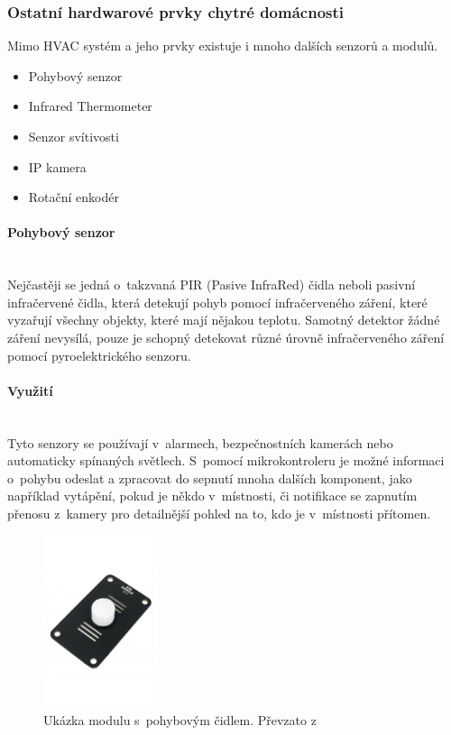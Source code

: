 \subsubsection*{Ostatní hardwarové prvky chytré domácnosti}
Mimo HVAC systém a jeho prvky existuje i mnoho dalších senzorů a modulů.

\begin{itemize}
  \item Pohybový senzor
  \item Infrared Thermometer
  \item Senzor svítivosti
  \item IP kamera
  \item Rotační enkodér
  \end{itemize}

\paragraph*{Pohybový senzor}\mbox{} \\ \label{PIR-sensor}
Nejčastěji se jedná o~takzvaná PIR (Pasive InfraRed) čidla neboli pasivní infračervené čidla, která detekují pohyb pomocí infračerveného záření, které vyzařují všechny objekty, které mají nějakou teplotu. Samotný detektor žádné záření nevysílá, pouze je schopný detekovat různé úrovně infračerveného záření pomocí pyroelektrického senzoru\cite{PIR-principle}.

\paragraph*{Využití}\mbox{} \\
Tyto senzory se používají v~alarmech, bezpečnostních kamerách nebo automaticky spínaných světlech. S~pomocí mikrokontroleru je možné informaci o~pohybu odeslat a zpracovat do sepnutí mnoha dalších komponent, jako například vytápění, pokud je někdo v~místnosti, či notifikace se zapnutím přenosu z~kamery pro detailnější pohled na to, kdo je v~místnosti přítomen.

\begin{figure}[H]
  \centering
  \includegraphics[width=0.3\textwidth]{obrazky-figures/hardwareComponents/PIRSensor.png}
  \caption{Ukázka modulu s~pohybovým čidlem. Převzato z~\cite{hardwario-module-overview}}
  \label{pirMotionSensor}
\end{figure}

